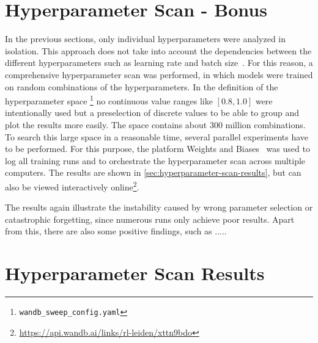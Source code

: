 \documentclass{article}
\begin{document}


\section{Hyperparameter Scan - Bonus}
\label{sec:bonus}
In the previous sections, only individual hyperparameters were analyzed in isolation.
This approach does not take into account the dependencies between the different hyperparameters 
such as learning rate and batch size~\cite{DBLP:conf/iclr/SmithKYL18}.
For this reason, a comprehensive hyperparameter scan was performed, in which models were trained on random combinations of the hyperparameters. 
In the definition of the hyperparameter space \footnote{\texttt{wandb\_sweep\_config.yaml}} 
no continuous value ranges like $[0.8, 1.0]$ were intentionally used but a preselection of discrete values to be able to group and plot the results more easily.
The space contains about 300 million combinations. 
To search this large space in a reasonable time, several parallel experiments have to be performed. 
For this purpose, the platform Weights and Biases~\cite{wandb} was used to log all training runs and to orchestrate the hyperparameter scan across multiple computers.
The results are shown in \autoref{sec:hyperparameter-scan-results},
but can also be viewed interactively online\footnote{\url{https://api.wandb.ai/links/rl-leiden/xttn9bdo}}.

The results again illustrate the instability caused by wrong parameter selection or catastrophic forgetting, 
since numerous runs only achieve poor results.
Apart from this, there are also some positive findings, such as .....

\nocite{DBLP:books/sp/Plaat22}





\appendix
\section{Hyperparameter Scan Results}
\label{sec:hyperparameter-scan-results}
\end{document}
